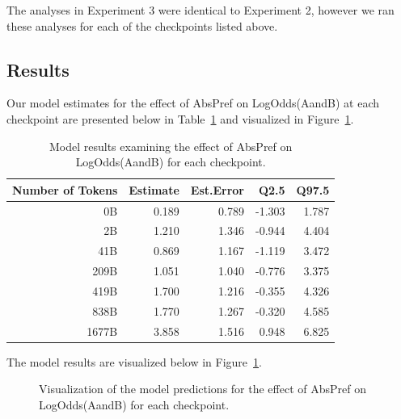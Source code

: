 \documentclass[
  12pt,
  letterpaper,
]{scrreprt}
\begin{document}
The analyses in Experiment 3 were identical to Experiment 2, however we
ran these analyses for each of the checkpoints listed above.

\subsection{Results}\label{results-7}

Our model estimates for the effect of AbsPref on LogOdds(AandB) at each
checkpoint are presented below in Table~\ref{tbl-exp2m1} and visualized
in Figure~\ref{fig-exp2m1}.

\begin{longtable}[]{@{}rrrrr@{}}

\caption{\label{tbl-exp2m1}Model results examining the effect of AbsPref
on LogOdds(AandB) for each checkpoint.}

\tabularnewline

\toprule\noalign{}
Number of Tokens & Estimate & Est.Error & Q2.5 & Q97.5 \\
\midrule\noalign{}
\endhead
\bottomrule\noalign{}
\endlastfoot
0B & 0.189 & 0.789 & -1.303 & 1.787 \\
2B & 1.210 & 1.346 & -0.944 & 4.404 \\
41B & 0.869 & 1.167 & -1.119 & 3.472 \\
209B & 1.051 & 1.040 & -0.776 & 3.375 \\
419B & 1.700 & 1.216 & -0.355 & 4.326 \\
838B & 1.770 & 1.267 & -0.320 & 4.585 \\
1677B & 3.858 & 1.516 & 0.948 & 6.825 \\

\end{longtable}

The model results are visualized below in Figure~\ref{fig-exp2m1}.

\begin{figure}[htbp]

\caption{\label{fig-exp2m1}Visualization of the model predictions for
the effect of AbsPref on LogOdds(AandB) for each checkpoint.}


\end{figure}%
\end{document}

